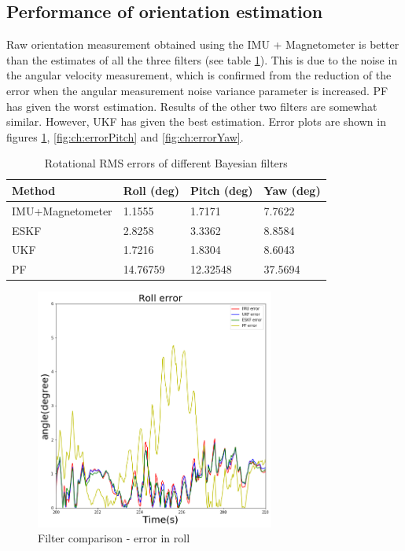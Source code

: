 \subsection{Performance of orientation estimation}
Raw orientation measurement obtained using the \gls{IMU} + Magnetometer is better than the estimates of all the three filters (see table \ref{table:ch:RMSErrorRotation}). This is due to the noise in the angular velocity measurement, which is confirmed from the reduction of the error when the angular measurement noise variance parameter is increased. \gls{PF} has given the worst estimation. Results of the other two filters are somewhat similar. However, \gls{UKF} has given the best
estimation. Error plots are shown in figures \ref{fig:ch:errorRoll}, \ref{fig:ch:errorPitch} and \ref{fig:ch:errorYaw}.
\begin{table}[htp]
    \centering
    \begin{tabular}{|p{4cm}|p{3cm}|p{3cm}|p{3cm}|} 
        \hline
        \textbf{Method} & \textbf{Roll (deg)} & \textbf{Pitch (deg)} & \textbf{Yaw (deg)} \\
        \hline
        \gls{IMU}+Magnetometer & 1.1555 &1.7171 &7.7622\\
        \hline
        ESKF& 2.8258& 3.3362& 8.8584\\
        \hline
        UKF &1.7216& 1.8304& 8.6043
        \\
        \hline
        PF &14.76759& 12.32548 &37.5694
        \\
        \hline
    \end{tabular}
    \caption{Rotational RMS errors of different Bayesian filters}
    \label{table:ch:RMSErrorRotation}
\end{table}

\begin{figure}[htp]
\centering
	\includegraphics[width=0.7\textwidth]{figs/roll.png}
    \vspace{-0.5cm}
	\caption{Filter comparison - error in roll}
	\label{fig:ch:errorRoll}
    \vspace{0.5cm}
\end{figure}

